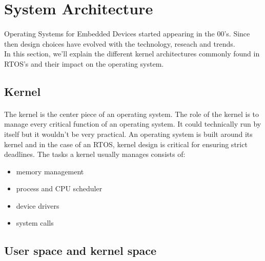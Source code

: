\section{System Architecture}

\paragraph{}
Operating Systems for Embedded Devices started appearing in the 00's.
Since then design choices have evolved with the technology, reseach and trends.
\\
In this section, we'll explain the different kernel architectures commonly found in RTOS's and their impact on the operating system.



\subsection{Kernel}
\paragraph{}
The kernel is the center piece of an operating system.
The role of the kernel is to manage every critical function of an operating system.
It could technically run by itself but it wouldn't be very practical.
An operating system is built around its kernel and in the case of an RTOS, kernel design is critical for ensuring strict deadlines.
The tasks a kernel usually manages consists of:
\begin{itemize}
    \item memory management
    \item process and CPU scheduler
    \item device drivers
    \item system calls
\end{itemize}


\subsection{User space and kernel space}
